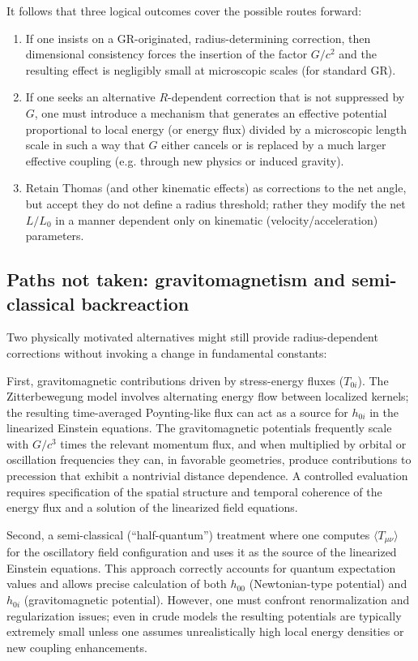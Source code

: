 \documentclass[%
 reprint,
 amsmath,amssymb,
 aps,
]{revtex4-1}
\numberwithin{equation}{section}%
\begin{document}
It follows that three logical outcomes cover the possible routes forward:
\begin{enumerate}
\item If one insists on a GR-originated, radius-determining correction, then dimensional consistency forces the insertion of the factor $G/c^{2}$ and the resulting effect is negligibly small at microscopic scales (for standard GR).
\item If one seeks an alternative $R$-dependent correction that is not suppressed by $G$, one must introduce a mechanism that generates an effective potential proportional to local energy (or energy flux) divided by a microscopic length scale in such a way that $G$ either cancels or is replaced by a much larger effective coupling (e.g. through new physics or induced gravity).
\item Retain Thomas (and other kinematic effects) as corrections to the net angle, but accept they do not define a radius threshold; rather they modify the net $L/L_0$ in a manner dependent only on kinematic (velocity/acceleration) parameters.
\end{enumerate}

\subsection{Paths not taken: gravitomagnetism and semi-classical backreaction}

Two physically motivated alternatives might still provide radius-dependent corrections without invoking a change in fundamental constants:

First, gravitomagnetic contributions driven by stress-energy fluxes ($T_{0i}$). The Zitterbewegung model involves alternating energy flow between localized kernels; the resulting time-averaged Poynting-like flux can act as a source for $h_{0i}$ in the linearized Einstein equations. The gravitomagnetic potentials frequently scale with $G/c^{3}$ times the relevant momentum flux, and when multiplied by orbital or oscillation frequencies they can, in favorable geometries, produce contributions to precession that exhibit a nontrivial distance dependence. A controlled evaluation requires specification of the spatial structure and temporal coherence of the energy flux and a solution of the linearized field equations.

Second, a semi-classical (``half-quantum'') treatment where one computes $\langle T_{\mu\nu}\rangle$ for the oscillatory field configuration and uses it as the source of the linearized Einstein equations. This approach correctly accounts for quantum expectation values and allows precise calculation of both $h_{00}$ (Newtonian-type potential) and $h_{0i}$ (gravitomagnetic potential). However, one must confront renormalization and regularization issues; even in crude models the resulting potentials are typically extremely small unless one assumes unrealistically high local energy densities or new coupling enhancements.
\end{document}
